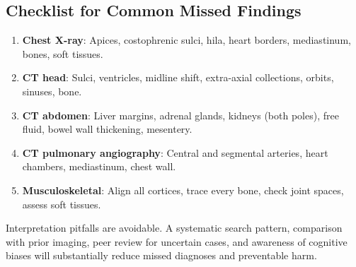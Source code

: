 \subsection{Checklist for Common Missed Findings}
\begin{enumerate}
    \item \textbf{Chest X-ray}: Apices, costophrenic sulci, hila, heart borders, mediastinum, bones, soft tissues.
    \item \textbf{CT head}: Sulci, ventricles, midline shift, extra-axial collections, orbits, sinuses, bone.
    \item \textbf{CT abdomen}: Liver margins, adrenal glands, kidneys (both poles), free fluid, bowel wall thickening, mesentery.
    \item \textbf{CT pulmonary angiography}: Central and segmental arteries, heart chambers, mediastinum, chest wall.
    \item \textbf{Musculoskeletal}: Align all cortices, trace every bone, check joint spaces, assess soft tissues.
\end{enumerate}

\begin{pearlbox}[Impression:]
Interpretation pitfalls are avoidable. A systematic search pattern, comparison with prior imaging, peer review for uncertain cases, and awareness of cognitive biases will substantially reduce missed diagnoses and preventable harm.
\end{pearlbox}

\clearpage
